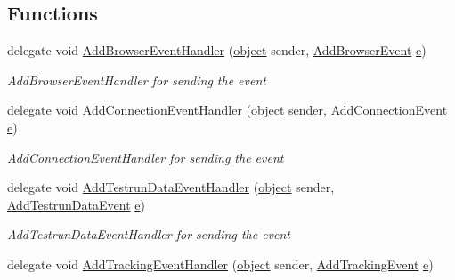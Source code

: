 \subsection*{Functions}
\begin{DoxyCompactItemize}
\item 
delegate void \hyperlink{namespace_web_analyzer_1_1_events_a7026c712fad5c0000a728950cb43c587}{Add\+Browser\+Event\+Handler} (\hyperlink{_u_i_2_h_t_m_l_resources_2js_2lib_2underscore_8min_8js_aae18b7515bb2bc4137586506e7c0c903}{object} sender, \hyperlink{class_web_analyzer_1_1_events_1_1_add_browser_event}{Add\+Browser\+Event} \hyperlink{_u_i_2_h_t_m_l_resources_2js_2lib_2bootstrap_8min_8js_ab5902775854a8b8440bcd25e0fe1c120}{e})
\begin{DoxyCompactList}\small\item\em Add\+Browser\+Event\+Handler for sending the event \end{DoxyCompactList}\item 
delegate void \hyperlink{namespace_web_analyzer_1_1_events_a902fba3fe7d4503704b73171cd38cf68}{Add\+Connection\+Event\+Handler} (\hyperlink{_u_i_2_h_t_m_l_resources_2js_2lib_2underscore_8min_8js_aae18b7515bb2bc4137586506e7c0c903}{object} sender, \hyperlink{class_web_analyzer_1_1_events_1_1_add_connection_event}{Add\+Connection\+Event} \hyperlink{_u_i_2_h_t_m_l_resources_2js_2lib_2bootstrap_8min_8js_ab5902775854a8b8440bcd25e0fe1c120}{e})
\begin{DoxyCompactList}\small\item\em Add\+Connection\+Event\+Handler for sending the event \end{DoxyCompactList}\item 
delegate void \hyperlink{namespace_web_analyzer_1_1_events_af583a888201519b2fb2a3cce6723c095}{Add\+Testrun\+Data\+Event\+Handler} (\hyperlink{_u_i_2_h_t_m_l_resources_2js_2lib_2underscore_8min_8js_aae18b7515bb2bc4137586506e7c0c903}{object} sender, \hyperlink{class_web_analyzer_1_1_events_1_1_add_testrun_data_event}{Add\+Testrun\+Data\+Event} \hyperlink{_u_i_2_h_t_m_l_resources_2js_2lib_2bootstrap_8min_8js_ab5902775854a8b8440bcd25e0fe1c120}{e})
\begin{DoxyCompactList}\small\item\em Add\+Testrun\+Data\+Event\+Handler for sending the event \end{DoxyCompactList}\item 
delegate void \hyperlink{namespace_web_analyzer_1_1_events_af9a78356c120c2e762b646299c47ece7}{Add\+Tracking\+Event\+Handler} (\hyperlink{_u_i_2_h_t_m_l_resources_2js_2lib_2underscore_8min_8js_aae18b7515bb2bc4137586506e7c0c903}{object} sender, \hyperlink{class_web_analyzer_1_1_events_1_1_add_tracking_event}{Add\+Tracking\+Event} \hyperlink{_u_i_2_h_t_m_l_resources_2js_2lib_2bootstrap_8min_8js_ab5902775854a8b8440bcd25e0fe1c120}{e})

\end{DoxyCompactItemize}
